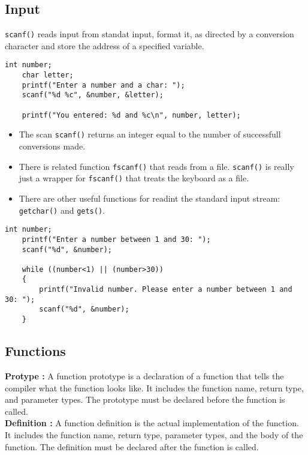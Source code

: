 \documentclass[a4paper, 10pt]{article}
\begin{document}
\subsection{Input}
\texttt{scanf()} reads input from standat input, format it, as directed by a conversion character and store the address of a specified variable.
\begin{lstlisting}[style=cStyle, caption={Reading an integer}]
    int number; 
    char letter; 
    printf("Enter a number and a char: ");
    scanf("%d %c", &number, &letter);

    printf("You entered: %d and %c\n", number, letter);
\end{lstlisting}
\begin{itemize}
    \item The scan \texttt{scanf()} returns an integer equal to the number of successfull conversions made.
    \item There is related function \texttt{fscanf()} that reads from a file. \texttt{scanf()} is really just a wrapper for \texttt{fscanf()} that treats the keyboard as a file.
    \item There are other useful functions for readint the standard input stream: \texttt{getchar()} and \texttt{gets()}.
\end{itemize}
\begin{lstlisting}[style=cStyle, caption={Check for no input}]
    int number;
    printf("Enter a number between 1 and 30: ");
    scanf("%d", &number);

    while ((number<1) || (number>30))
    {
        printf("Invalid number. Please enter a number between 1 and 30: ");
        scanf("%d", &number);
    }
\end{lstlisting}

\subsection{Functions}
\begin{definitionbox}
    \textbf{Protype :} A function prototype is a declaration of a function that tells the compiler what the function looks like. It includes the function name, return type, and parameter types. The prototype must be declared before the function is called.\\[2ex]
    \textbf{Definition :} A function definition is the actual implementation of the function. It includes the function name, return type, parameter types, and the body of the function. The definition must be declared after the function is called.
\end{definitionbox}
\end{document}
